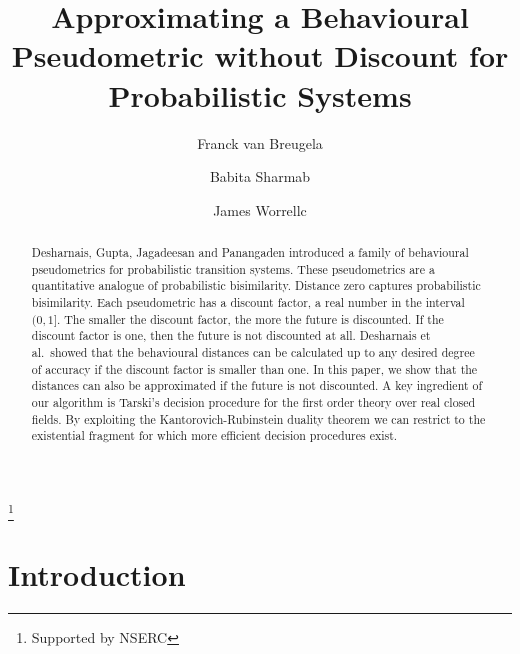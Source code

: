 \documentclass{LMCS}
\begin{document}
\title[Approximating a Behavioural Pseudometric]{Approximating a
Behavioural Pseudometric without Discount for Probabilistic
Systems\rsuper *}
\author[F.~van Breugel]{Franck van Breugel\rsuper a}
\address{{\lsuper a}York University,
         4700 Keele Street, Toronto, M3J 1P3, Canada}
\thanks{{}Supported by NSERC}
\author[B.~Sharma]{Babita Sharma\rsuper b}
\address{{\lsuper b}IBM Toronto Lab, 8200 Warden Avenue, Markham, L6G
1C7, Canada}
\author[J.~Worrell]{James Worrell\rsuper c}
\address{{\lsuper c}Oxford University Computing Laboratory,
         Parks Road, Oxford, OX1 3QD, England}

\begin{abstract}
\noindent
Desharnais, Gupta, Jagadeesan and Panangaden introduced a family of behavioural
pseudometrics for probabilistic transition systems.  These pseudometrics are a
quantitative analogue of probabilistic bisimilarity.  Distance zero captures
probabilistic bisimilarity.  Each pseudometric has a discount factor, a real 
number in the interval $(0, 1]$.  The smaller the discount factor, the more 
the future is discounted.  If the discount factor is one, then the future is 
not discounted at all.  Desharnais et al.\ showed that the behavioural 
distances can be calculated up to any desired degree of accuracy if the 
discount factor is smaller than one.  In this paper, we show that the 
distances can also be approximated if the future is not discounted.  A key 
ingredient of our algorithm is Tarski's decision procedure for the first order 
theory over real closed fields.  By exploiting the Kantorovich-Rubinstein 
duality theorem we can restrict to the existential fragment for which more 
efficient decision procedures exist.
\end{abstract}

\maketitle

\section{Introduction}
\end{document}
